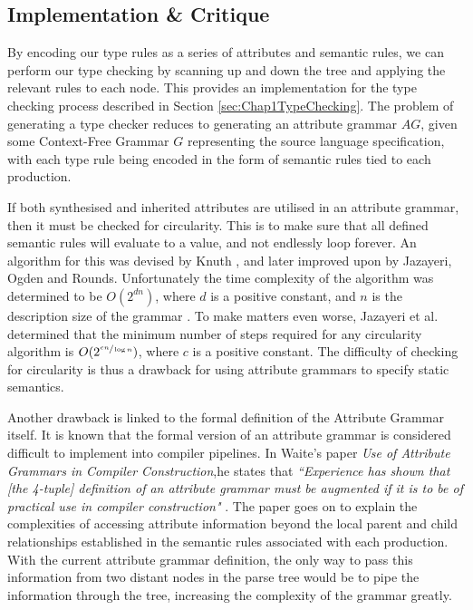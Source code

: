 \documentclass{UoYCSproject}
\begin{document}
\subsection{Implementation \& Critique}
\label{sec:ImplAndCritique}
By encoding our type rules as a series of attributes and semantic rules, we can
perform our type checking by scanning up and down the tree and applying the
relevant rules to each node. This provides an implementation for the type
checking process described in Section \ref{sec:Chap1TypeChecking}. The problem 
of generating a type checker reduces to generating an attribute grammar $AG$, 
given some Context-Free Grammar $G$ representing the source language 
specification, with each type rule being encoded in the form of semantic rules 
tied to each production. 

If both synthesised and inherited attributes are utilised in an attribute
grammar, then it must be checked for circularity. This is to make sure
that all defined semantic rules will evaluate to a value, and not endlessly
loop forever. An algorithm for this was devised by Knuth \cite{KnuthGrammars}
\cite{KnuthCorrection}, and later improved upon by Jazayeri, Ogden and Rounds.
Unfortunately the time complexity of the algorithm was determined to be 
$O(2^{dn})$, where $d$ is a positive constant, and $n$ is the 
description size of the grammar \cite{OgdenAGComplexity}. To make matters even 
worse, Jazayeri et al. determined that the minimum number of steps required for 
any circularity algorithm is $O(2^{\sfrac{cn}{\log n}})$, where $c$ is a 
positive constant. The difficulty of checking for circularity is thus 
a drawback for using attribute grammars to specify static semantics.

Another drawback is linked to the formal definition of the Attribute Grammar
itself. It is known that the formal version of an attribute grammar is 
considered difficult to implement into compiler pipelines. In Waite's 
paper \textit{Use of Attribute Grammars in Compiler Construction},he states 
that \textit{``Experience has shown that [the 4-tuple] definition of 
    an attribute grammar must be augmented if it is to be of practical use in 
    compiler construction"} \cite{WaitePaper}. The paper goes on to explain 
the complexities of accessing attribute information beyond the local parent and 
child relationships established in the semantic rules associated with each
production. With the current attribute grammar definition, the only way to pass 
this information from two distant nodes in the parse tree would be to pipe the 
information through the tree, increasing the complexity of the grammar greatly.
\end{document}
